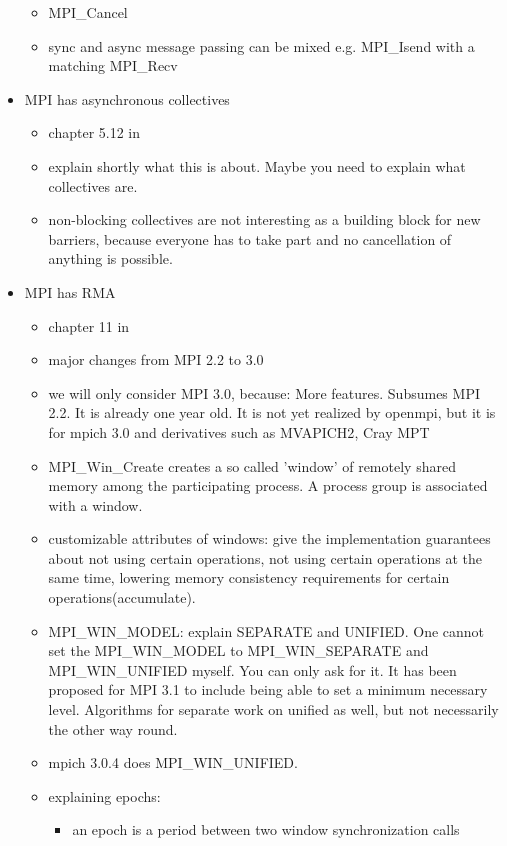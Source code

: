 \documentclass[a4paper, 10pt]{article}
\begin{document}
\begin{itemize}
\begin{itemize}
			\item MPI\_Cancel
			\item sync and async message passing can be mixed e.g. MPI\_Isend with a matching MPI\_Recv
		\end{itemize}
	\item MPI has asynchronous collectives
		\begin{itemize}
			\item chapter 5.12 in \cite{mpi3}
			\item explain shortly what this is about. Maybe you need to explain what collectives are.
			\item non-blocking collectives are not interesting as a building block for new barriers, because everyone has to take part and no cancellation of anything is possible.
		\end{itemize}
	\item MPI has RMA
		\begin{itemize}
			\item chapter 11 in \cite{mpi3}
			\item major changes from MPI 2.2\cite{mpi2} to 3.0\cite{mpi3onesided}
			\item we will only consider MPI 3.0, because: More features. Subsumes MPI 2.2. It is already one year old. It is not yet realized by openmpi, but it is for mpich 3.0 and derivatives such as MVAPICH2\cite{mvapich}, Cray MPT\cite{craympt}
			\item MPI\_Win\_Create creates a so called 'window' of remotely shared memory among the participating process. A process group is associated with a window.
			\item customizable attributes of windows: give the implementation guarantees about not using certain operations, not using certain operations at the same time, lowering memory consistency requirements for certain operations(accumulate).
			\item MPI\_WIN\_MODEL: explain SEPARATE and UNIFIED. One cannot set the MPI\_WIN\_MODEL to MPI\_WIN\_SEPARATE and MPI\_WIN\_UNIFIED myself. You can only ask for it. It has been proposed for MPI 3.1 to include being able to set a minimum necessary level. Algorithms for separate work on unified as well, but not necessarily the other way round.
			\item mpich 3.0.4 does MPI\_WIN\_UNIFIED.
			\item explaining epochs:
				\begin{itemize}
					\item an epoch is a period between two window synchronization calls

\end{itemize}
\end{itemize}
\end{itemize}
\end{document}
